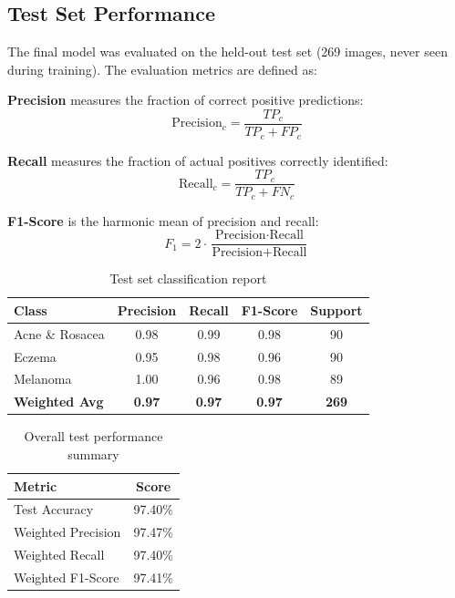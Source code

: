 \documentclass[10pt,a4paper,twocolumn]{article}
\begin{document}
\subsection{Test Set Performance}

The final model was evaluated on the held-out test set (269 images, never seen during training). The evaluation metrics are defined as:

\textbf{Precision} measures the fraction of correct positive predictions:
\begin{equation}
\text{Precision}_c = \frac{TP_c}{TP_c + FP_c}
\end{equation}

\textbf{Recall} measures the fraction of actual positives correctly identified:
\begin{equation}
\text{Recall}_c = \frac{TP_c}{TP_c + FN_c}
\end{equation}

\textbf{F1-Score} is the harmonic mean of precision and recall:
\begin{equation}
F_1 = 2 \cdot \frac{\text{Precision} \cdot \text{Recall}}{\text{Precision} + \text{Recall}}
\end{equation}

\begin{table}[H]
\centering
\caption{Test set classification report}
\label{tab:test_results}
\begin{tabular}{lcccc}
\toprule
\textbf{Class} & \textbf{Precision} & \textbf{Recall} & \textbf{F1-Score} & \textbf{Support} \\
\midrule
Acne \& Rosacea & 0.98 & 0.99 & 0.98 & 90 \\
Eczema & 0.95 & 0.98 & 0.96 & 90 \\
Melanoma & 1.00 & 0.96 & 0.98 & 89 \\
\midrule
\textbf{Weighted Avg} & \textbf{0.97} & \textbf{0.97} & \textbf{0.97} & \textbf{269} \\
\bottomrule
\end{tabular}
\end{table}

\begin{table}[H]
\centering
\caption{Overall test performance summary}
\label{tab:overall}
\begin{tabular}{lc}
\toprule
\textbf{Metric} & \textbf{Score} \\
\midrule
Test Accuracy & 97.40\% \\
Weighted Precision & 97.47\% \\
Weighted Recall & 97.40\% \\
Weighted F1-Score & 97.41\% \\
\bottomrule
\end{tabular}
\end{table}
\end{document}
